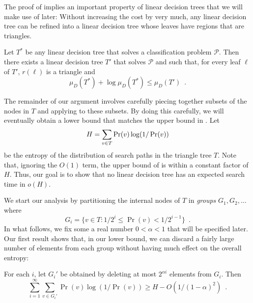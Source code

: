\documentclass[charterfonts,lotsofwhite]{patmorin}
\newcommand{\blah}{O(1/(1-\alpha)^2)}
\begin{document}
The proof of  implies an important property of
linear decision trees that we will make use of later: Without
increasing the cost by very much, any linear decision tree can be
refined into a linear decision tree whose leaves have regions that are
triangles.

\begin{cor}
Let $T^*$ be any linear decision tree that solves a classification
problem $\mathcal{P}$.  Then there exists a linear
decision tree $T'$ that solves $\mathcal{P}$ and such that, for every leaf
$\ell$ of $T'$, $r(\ell)$ is a triangle and 
\[
     \mu_D(T^*) + \log \mu_D(T^*) \le \mu_D(T') \enspace .
\]
\end{cor}

The remainder of our argument involves carefully piecing together
subsets of the nodes in $T$ and applying 
 to these subsets.  By doing this carefully, we
will eventually obtain a lower bound that matches the upper bound
in .  Let 
\begin{equation}
   H = \sum_{v\in T} \Pr(v)\log (1/\Pr(v)) \eqlabel{H}
\end{equation}
be the entropy of the distribution of search paths in the triangle
tree $T$.  Note that,
ignoring the $O(1)$ term,
the upper bound of  is within a constant factor of
$H$. Thus, our goal is to show that no linear decision tree has an
expected search time in $o(H)$.

We start our analysis by partitioning the internal nodes of $T$ in
\emph{groups} $G_1,G_2,\ldots$ where
\[
	G_i = \{v\in T : 1/2^{i} \le \Pr(v) < 1/2^{i-1} \} \enspace .
\]
In what follows, we fix some a real number $0< \alpha < 1$ that will be
specified later.  Our first
result shows that, in our lower bound, we can discard a fairly large
number of elements from each group without having much effect on the
overall entropy:

\begin{lem}
For each $i$, let $G_i'$ be obtained by deleting at most $2^{\alpha
i}$ elements from $G_i$.  Then
\[
    \sum_{i=1}^\infty \sum_{v\in G_i'} \Pr(v)\log(1/\Pr(v)) 
       \ge H-\blah \enspace .
\]
\end{lem}
\end{document}
